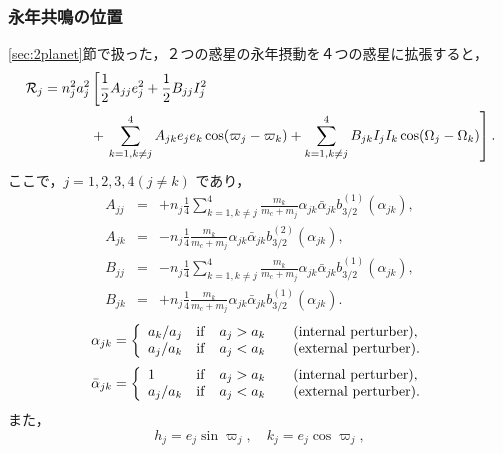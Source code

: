 \documentclass[11pt,a4paper,oneside,onecolumn]{jreport}
\begin{document}
\subsubsection{永年共鳴の位置}
\ref{sec:2planet}節で扱った，２つの惑星の永年摂動を４つの惑星に拡張すると，
\begin{equation}
\begin{split}
{\cal R}_j = n_j^2 a_j^2 & \left[ \frac{1}{2} A_{jj} e_j^2 + \frac{1}{2} B_{jj} I_j^2 \right. \\
& + \left. \sum_{k = 1, k \not= j}^4 A_{jk} e_j e_k \cos (\varpi_j - \varpi_k) + \sum_{k = 1, k \not= j}^4 B_{jk} I_j I_k \cos (\Omega_j - \Omega_k) \right]. \\
\end{split} \label{}
\end{equation}
ここで，$j = 1, 2, 3, 4 (j \not= k)$ であり，
\begin{eqnarray}
A_{jj} & = & + n_j \frac{1}{4} \sum_{k = 1, k \not= j}^4 \frac{m_k}{m_c + m_j} \alpha_{jk} \bar{\alpha}_{jk} b_{3/2}^{(1)} (\alpha_{jk}), \\
A_{jk} & = & - n_j \frac{1}{4} \frac{m_k}{m_c + m_j} \alpha_{jk} \bar{\alpha}_{jk} b_{3/2}^{(2)} (\alpha_{jk}), \\
B_{jj} & = & - n_j \frac{1}{4} \sum_{k = 1, k \not= j}^4 \frac{m_k}{m_c + m_j} \alpha_{jk} \bar{\alpha}_{jk} b_{3/2}^{(1)} (\alpha_{jk}), \\
B_{jk} & = & + n_j \frac{1}{4} \frac{m_k}{m_c + m_j} \alpha_{jk} \bar{\alpha}_{jk} b_{3/2}^{(1)} (\alpha_{jk}). 
\end{eqnarray}
\begin{equation}
\alpha_{jk} = \left\{
\begin{array}{llll}
a_k / a_j & {\rm if} & a_j > a_k & \quad ({\rm internal \ perturber}), \\
a_j / a_k & {\rm if} & a_j < a_k & \quad ({\rm external \ perturber}).
\end{array}
\right.
\end{equation}
\begin{equation}
\bar{\alpha}_{jk} = \left\{
\begin{array}{llll}
1 & {\rm if} & a_j > a_k & \quad ({\rm internal \ perturber}), \\
a_j / a_k & {\rm if} & a_j < a_k & \quad ({\rm external \ perturber}).
\end{array}
\right.
\end{equation}
また，
\begin{equation}
h_j = e_j \sin \varpi_j, \quad k_j = e_j \cos \varpi_j,
\end{equation}
\end{document}
